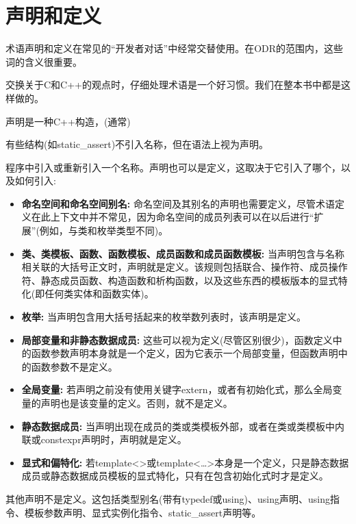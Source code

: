 \section{声明和定义}
术语声明和定义在常见的“开发者对话”中经常交替使用。在ODR的范围内，这些词的含义很重要。

\begin{notice}
交换关于C和C++的观点时，仔细处理术语是一个好习惯。我们在整本书中都是这样做的。
\end{notice}

声明是一种C++构造，(通常)

\begin{notice}
有些结构(如static\_assert)不引入名称，但在语法上视为声明。
\end{notice}

程序中引入或重新引入一个名称。声明也可以是定义，这取决于它引入了哪个，以及如何引入:

\begin{itemize}
\item 
\textbf{命名空间和命名空间别名:}
命名空间及其别名的声明也需要定义，尽管术语定义在此上下文中并不常见，因为命名空间的成员列表可以在以后进行“扩展”(例如，与类和枚举类型不同)。

\item 
\textbf{类、类模板、函数、函数模板、成员函数和成员函数模板: }
当声明包含与名称相关联的大括号正文时，声明就是定义。该规则包括联合、操作符、成员操作符、静态成员函数、构造函数和析构函数，以及这些东西的模板版本的显式特化(即任何类实体和函数实体)。

\item 
\textbf{枚举:}
当声明包含用大括号括起来的枚举数列表时，该声明是定义。

\item 
\textbf{局部变量和非静态数据成员:}
这些可以视为定义(尽管区别很少)，函数定义中的函数参数声明本身就是一个定义，因为它表示一个局部变量，但函数声明中的函数参数不是定义。

\item 
\textbf{全局变量:}
若声明之前没有使用关键字extern，或者有初始化式，那么全局变量的声明也是该变量的定义。否则，就不是定义。

\item 
\textbf{静态数据成员: }
当声明出现在成员的类或类模板外部，或者在类或类模板中内联或constexpr声明时，声明就是定义。

\item 
\textbf{显式和偏特化:}
若template<>或template<…>本身是一个定义，只是静态数据成员或静态数据成员模板的显式特化，只有在包含初始化式时才是定义。

\end{itemize}

其他声明不是定义。这包括类型别名(带有typedef或using)、using声明、using指令、模板参数声明、显式实例化指令、static\_assert声明等。






